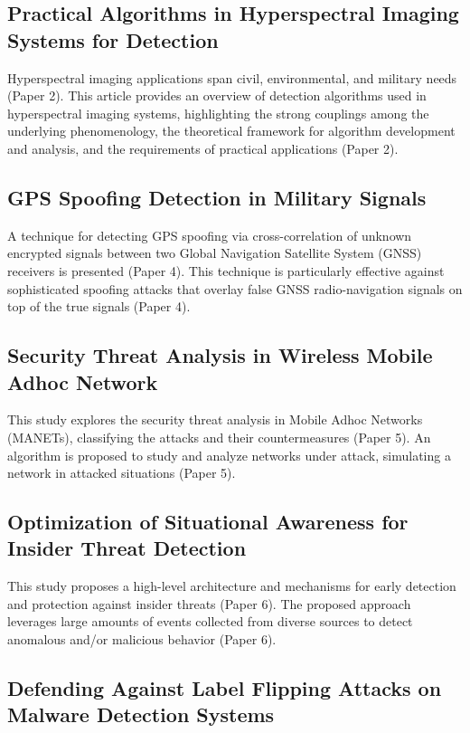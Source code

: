 \documentclass{article}
\begin{document}
\subsection{Practical Algorithms in Hyperspectral Imaging Systems for Detection}

Hyperspectral imaging applications span civil, environmental, and military needs (Paper 2). This article provides an overview of detection algorithms used in hyperspectral imaging systems, highlighting the strong couplings among the underlying phenomenology, the theoretical framework for algorithm development and analysis, and the requirements of practical applications (Paper 2).

\subsection{GPS Spoofing Detection in Military Signals}

A technique for detecting GPS spoofing via cross-correlation of unknown encrypted signals between two Global Navigation Satellite System (GNSS) receivers is presented (Paper 4). This technique is particularly effective against sophisticated spoofing attacks that overlay false GNSS radio-navigation signals on top of the true signals (Paper 4).

\subsection{Security Threat Analysis in Wireless Mobile Adhoc Network}

This study explores the security threat analysis in Mobile Adhoc Networks (MANETs), classifying the attacks and their countermeasures (Paper 5). An algorithm is proposed to study and analyze networks under attack, simulating a network in attacked situations (Paper 5).

\subsection{Optimization of Situational Awareness for Insider Threat Detection}

This study proposes a high-level architecture and mechanisms for early detection and protection against insider threats (Paper 6). The proposed approach leverages large amounts of events collected from diverse sources to detect anomalous and/or malicious behavior (Paper 6).

\subsection{Defending Against Label Flipping Attacks on Malware Detection Systems}
\end{document}
